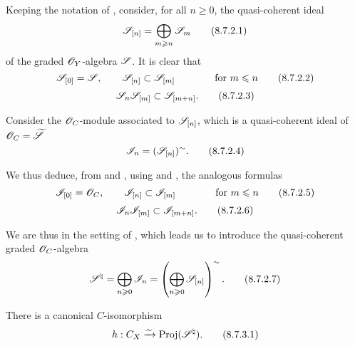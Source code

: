 \begin{env}[8.7.2]
\label{II.8.7.2}
Keeping the notation of , consider, for all $n\geq0$, the quasi-coherent ideal
\[
\label{II.8.7.2.1}
  \mathscr{S}_{[n]} = \bigoplus_{m\geqslant n}\mathscr{S}_m
\tag{8.7.2.1}
\]
of the graded $\mathscr{O}_Y$-algebra $\mathscr{S}$.
It is clear that
\[
\label{II.8.7.2.2}
  \mathscr{S}_{[0]} = \mathscr{S},
  \qquad
  \mathscr{S}_{[n]} \subset \mathscr{S}_{[m]}
  \qquad\qquad
  \mbox{for $m\leqslant n$}
\tag{8.7.2.2}
\]
\[
\label{II.8.7.2.3}
  \mathscr{S}_{n} \mathscr{S}_{[m]} \subset \mathscr{S}_{[m+n]}.
\tag{8.7.2.3}
\]

Consider the $\mathscr{O}_C$-module associated to $\mathscr{S}_{[n]}$, which is a quasi-coherent ideal of $\mathscr{O}_C = \widetilde{\mathscr{S}}$ 
\[
\label{II.8.7.2.4}
  \mathscr{I}_n = (\mathscr{S}_{[n]})^\sim.
\tag{8.7.2.4}
\]

We thus deduce, from  and , using  and , the analogous formulas
\[
\label{II.8.7.2.5}
  \mathscr{I}_{[0]} = \mathscr{O}_C,
  \qquad
  \mathscr{I}_{[n]} \subset \mathscr{I}_{[m]}
  \qquad\qquad
  \mbox{for $m\leqslant n$}
\tag{8.7.2.5}
\]
\[
\label{II.8.7.2.6}
  \mathscr{I}_{n} \mathscr{I}_{[m]} \subset \mathscr{I}_{[m+n]}.
\tag{8.7.2.6}
\]

We are thus in the setting of , which leads us to introduce the quasi-coherent graded $\mathscr{O}_C$-algebra
\[
\label{II.8.7.2.7}
  \mathscr{S}^\natural
  =
  \bigoplus_{n\geqslant0}\mathscr{I}_n
  =
  \left(
    \bigoplus_{n\geqslant0} \mathscr{S}_{[n]}
  \right)^\sim.
\tag{8.7.2.7}
\]
\end{env}

\begin{proposition}[8.7.3]
\label{II.8.7.3}
There is a canonical $C$-isomorphism
\[
\label{II.8.7.3.1}
  h: C_X \xrightarrow{\sim} \operatorname{Proj}(\mathscr{S}^\natural).
\tag{8.7.3.1}
\]
\end{proposition}

